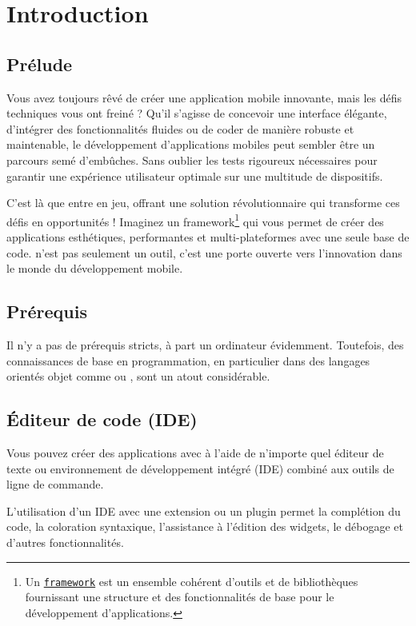 \section{Introduction}\label{introduction}

\subsection{Prélude}
\par Vous avez toujours rêvé de créer une application mobile innovante, mais les défis techniques vous ont freiné ? Qu'il s'agisse de concevoir une interface élégante, d'intégrer des fonctionnalités fluides ou de coder de manière robuste et maintenable, le développement d'applications mobiles peut sembler être un parcours semé d'embûches. Sans oublier les tests rigoureux nécessaires pour garantir une expérience utilisateur optimale sur une multitude de dispositifs.

\par C'est là que \flutter{} entre en jeu, offrant une solution révolutionnaire qui transforme ces défis en opportunités ! Imaginez un framework\footnote{Un \href{https://fr.wikipedia.org/wiki/Framework}{\texttt{framework}} est un ensemble cohérent d'outils et de bibliothèques fournissant une structure et des fonctionnalités de base pour le développement d'applications.} qui vous permet de créer des applications esthétiques, performantes et multi-plateformes avec une seule base de code. \flutter{} n'est pas seulement un outil, c'est une porte ouverte vers l'innovation dans le monde du développement mobile.

\subsection{Prérequis}
\par Il n'y a pas de prérequis stricts, à part un ordinateur évidemment. Toutefois, des connaissances de base en programmation, en particulier dans des langages orientés objet comme \java{} ou \cplusplus{}, sont un atout considérable.

\subsection{Éditeur de code (IDE)}
Vous pouvez créer des applications avec \flutter{} à l'aide de n'importe quel éditeur de texte ou environnement de développement intégré (IDE) combiné aux outils de ligne de commande.

L'utilisation d'un IDE avec une extension ou un plugin \flutter{} permet la complétion du code, la coloration syntaxique, l'assistance à l'édition des widgets, le débogage et d'autres fonctionnalités.


